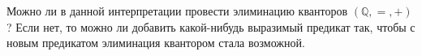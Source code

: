 Можно ли в данной интерпретации провести элиминацию кванторов $(\mathbb{Q}, =, +)$? Если нет, то можно ли добавить
какой-нибудь выразимый предикат так, чтобы с новым предикатом элиминация квантором стала возможной.